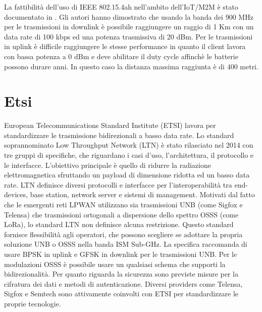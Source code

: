 \documentclass[12pt,a4paper,openright,twoside]{report}
\begin{document}
La fattibilit\`a dell'uso di IEEE 802.15.4ah nell'ambito dell'IoT/M2M \`e stato documentato in \cite{K9}. Gli autori hanno dimostrato che usando la banda dei 900 MHz per le trasmissioni in downlink \`e possibile raggiungere un raggio di 1 Km con un data rate di 100 kbps ed una potenza trasmissiva di 20 dBm. Per le trasmissioni in uplink \`e difficile raggiungere le stesse performance in quanto il client lavora con bassa potenza a 0 dBm e deve abilitare il duty cycle affinch\`e le batterie possono durare anni. 
In questo caso la distanza massima raggiunta \`e di 400 metri. 

\section{Etsi}
European Telecommunications Standard Institute (ETSI) lavora per standardizzare le trasmissione bidirezionali a basso data rate. Lo standard soprannominato Low
Throughput Network (LTN) \`e stato rilasciato nel 2014 con tre gruppi di specifiche, che riguardano i casi d'uso, l'architettura, il protocollo e le interfacce.    
L'obiettivo principale \`e quello di ridurre la radiazione elettromagnetica sfruttando un payload di dimensione ridotta ed un basso data rate. LTN definisce diversi protocolli e interfacce per l'interoperabilit\`a tra end-devices, base station, network server e sistemi di management. Motivati dal fatto che le emergenti reti LPWAN utilizzano sia trasmissioni UNB (come Sigfox e Telensa) che trasmissioni ortogonali a dispersione dello spettro OSSS (come LoRa), lo standard LTN non definisce alcuna restrizione. Questo standard fornisce flessibilit\`a agli operatori, che possono scegliere se adottare la propria soluzione UNB o OSSS nella banda ISM Sub-GHz. La specifica raccomanda di usare BPSK in uplink e GFSK in downlink per le trasmissioni UNB. Per le modulazioni OSSS \`e possibile usare un qualsiasi schema che supporti la bidirezionalit\`a.   
Per quanto riguarda la sicurezza sono previste misure per la cifratura dei dati e metodi di autenticazione. Diversi providers come Telensa, Sigfox e Semtech sono attivamente coinvolti con ETSI per standardizzare le proprie tecnologie.
\end{document}
